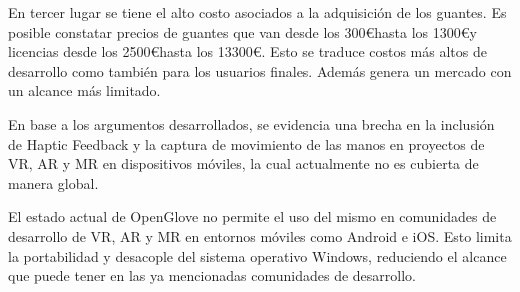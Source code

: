 En tercer lugar se tiene el alto costo asociados a la adquisición de los guantes. Es posible constatar precios de guantes que van desde los 300\euro \space hasta los 1300\euro \space y licencias desde los 2500\euro \space hasta los 13300\euro . Esto se traduce  costos más altos de desarrollo como también para los usuarios finales. Además genera un mercado con un alcance más limitado.

En base a los argumentos desarrollados, se evidencia una brecha en la inclusión de Haptic Feedback  y la captura de movimiento de las manos en proyectos de VR, AR y MR en dispositivos móviles, la cual actualmente no es cubierta de manera global.

El estado actual de OpenGlove no permite el uso del mismo en comunidades de desarrollo de VR, AR y MR en entornos móviles como Android e iOS. Esto limita la portabilidad y desacople del sistema operativo Windows, reduciendo el alcance que puede tener en las ya mencionadas comunidades de desarrollo.

